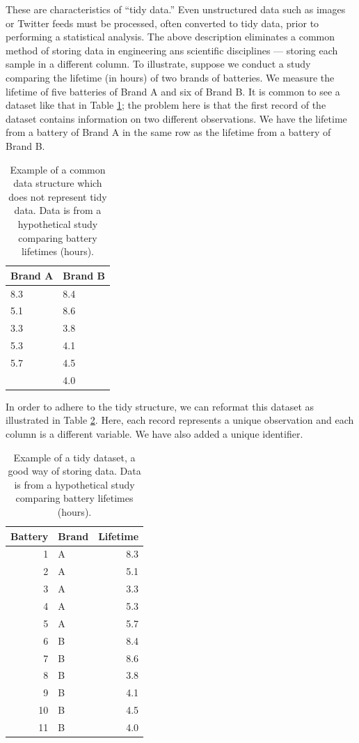 \documentclass[]{book}
\theoremstyle{definition}
\theoremstyle{definition}
\theoremstyle{definition}
\theoremstyle{remark}
\begin{document}
These are characteristics of ``tidy data.'' Even unstructured data such
as images or Twitter feeds must be processed, often converted to tidy
data, prior to performing a statistical analysis. The above description
eliminates a common method of storing data in engineering ans scientific
disciplines --- storing each sample in a different column. To
illustrate, suppose we conduct a study comparing the lifetime (in hours)
of two brands of batteries. We measure the lifetime of five batteries of
Brand A and six of Brand B. It is common to see a dataset like that in
Table \ref{tab:basics-poor-dataset}; the problem here is that the first
record of the dataset contains information on two different
observations. We have the lifetime from a battery of Brand A in the same
row as the lifetime from a battery of Brand B.

\begin{table}

\caption{\label{tab:basics-poor-dataset}Example of a common data structure which does not represent tidy data.  Data is from a hypothetical study comparing battery lifetimes (hours).}
\centering
\begin{tabular}[t]{l|l}
\hline
Brand A & Brand B\\
\hline
8.3 & 8.4\\
\hline
5.1 & 8.6\\
\hline
3.3 & 3.8\\
\hline
5.3 & 4.1\\
\hline
5.7 & 4.5\\
\hline
 & 4.0\\
\hline
\end{tabular}
\end{table}

In order to adhere to the tidy structure, we can reformat this dataset
as illustrated in Table \ref{tab:basics-good-dataset}. Here, each record
represents a unique observation and each column is a different variable.
We have also added a unique identifier.

\begin{table}

\caption{\label{tab:basics-good-dataset}Example of a tidy dataset, a good way of storing data.  Data is from a hypothetical study comparing battery lifetimes (hours).}
\centering
\begin{tabular}[t]{r|l|r}
\hline
Battery & Brand & Lifetime\\
\hline
1 & A & 8.3\\
\hline
2 & A & 5.1\\
\hline
3 & A & 3.3\\
\hline
4 & A & 5.3\\
\hline
5 & A & 5.7\\
\hline
6 & B & 8.4\\
\hline
7 & B & 8.6\\
\hline
8 & B & 3.8\\
\hline
9 & B & 4.1\\
\hline
10 & B & 4.5\\
\hline
11 & B & 4.0\\
\hline
\end{tabular}
\end{table}
\end{document}
